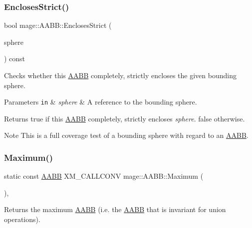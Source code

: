 \subsubsection{\texorpdfstring{Encloses\+Strict()}{EnclosesStrict()}\hspace{0.1cm}{\footnotesize\ttfamily [4/4]}}
{\footnotesize\ttfamily bool mage\+::\+A\+A\+B\+B\+::\+Encloses\+Strict (\begin{DoxyParamCaption}\item[{const \hyperlink{classmage_1_1_bounding_sphere}{Bounding\+Sphere} \&}]{sphere }\end{DoxyParamCaption}) const\hspace{0.3cm}{\ttfamily [noexcept]}}

Checks whether this \hyperlink{classmage_1_1_a_a_b_b}{A\+A\+BB} completely, strictly encloses the given bounding sphere.


\begin{DoxyParams}[1]{Parameters}
\mbox{\tt in}  & {\em sphere} & A reference to the bounding sphere. \\
\hline
\end{DoxyParams}
\begin{DoxyReturn}{Returns}
{\ttfamily true} if this \hyperlink{classmage_1_1_a_a_b_b}{A\+A\+BB} completely, strictly encloses {\itshape sphere}. {\ttfamily false} otherwise. 
\end{DoxyReturn}
\begin{DoxyNote}{Note}
This is a full coverage test of a bounding sphere with regard to an \hyperlink{classmage_1_1_a_a_b_b}{A\+A\+BB}. 
\end{DoxyNote}
\hypertarget{classmage_1_1_a_a_b_b_a72f4f49b07a3816ad74fde9defc8cb76}{}\label{classmage_1_1_a_a_b_b_a72f4f49b07a3816ad74fde9defc8cb76} 
\subsubsection{\texorpdfstring{Maximum()}{Maximum()}}
{\footnotesize\ttfamily static const \hyperlink{classmage_1_1_a_a_b_b}{A\+A\+BB} X\+M\+\_\+\+C\+A\+L\+L\+C\+O\+NV mage\+::\+A\+A\+B\+B\+::\+Maximum (\begin{DoxyParamCaption}{ }\end{DoxyParamCaption})\hspace{0.3cm}{\ttfamily [static]}, {\ttfamily [noexcept]}}

Returns the maximum \hyperlink{classmage_1_1_a_a_b_b}{A\+A\+BB} (i.\+e. the \hyperlink{classmage_1_1_a_a_b_b}{A\+A\+BB} that is invariant for union operations).

